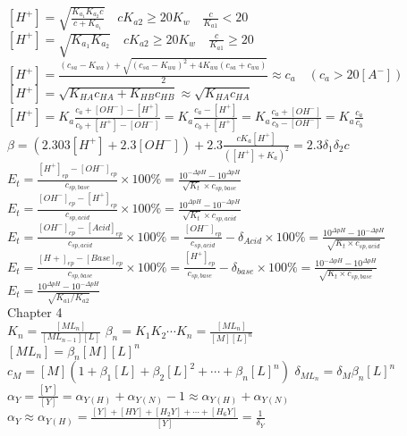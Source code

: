 \documentclass[10pt,twocolumn]{article}
\begin{document}
    \([H^+] =\sqrt{\frac{K_{a_1}K_{a_2}c}{c+K_{a_1}}} \quad cK_{a2} \geq 20K_w \quad \frac{c}{K_{a1}} < 20\) \\
    \([H^+] = \sqrt{K_{a_1}K_{a_2}} \quad cK_{a2} \geq 20K_w \quad \frac{c}{K_{a1}}\geq 20\) \\
    \([H^+]=\frac{(c_{sa}-K_{wa})+\sqrt{(c_{sa}-K_{wa})^2+4K_{wa}(c_{sa}+c_{wa})}}{2} \approx c_a \quad (c_a > 20[A^-])\)
    \\ \([H^+]=\sqrt{K_{HA}c_{HA}+K_{HB}c_{HB}} \approx \sqrt{K_{HA}c_{HA}}\)
    \\ \([H^+]=K_a\frac{c_a+[{OH}^-]-[H^+]}{c_b+[H^+]-[{OH}^-]}=K_a\frac{c_a-[H^+]}{c_b+[H^+]}=K_a\frac{c_a+[{OH}^-]}{c_b-[{OH}^-]}=K_a\frac{c_a}{c_b}\)
    \\ \(\beta = (2.303[H^+]+2.3[{OH}^-])+2.3\frac{cK_a[H^+]}{([H^+]+K_a)^2} = 2.3 \delta_1 \delta_2 c\) \\
    \(E_t=\frac{[H^+]_{ep}-[OH^-]_{ep}}{c_{sp,base}}\times 100\% = \frac{10^{-\Delta pH}-10^{\Delta pH}}{\sqrt{K_t}\times c_{sp,base}}\) \\
    \(E_t=\frac{[OH^-]_{ep}-[H^+]_{ep}}{c_{sp,acid}}\times 100\%= \frac{10^{\Delta pH}-10^{-\Delta pH}}{\sqrt{K_t}\times c_{sp,acid}}\) \\
    \(E_t=\frac{[OH^-]_{ep}-[Acid]_{ep}}{c_{sp,acid}}\times 100\% = \frac{[OH^-]_{ep}}{c_{sp,acid}} - \delta _{Acid}\times 100\% = \frac{10^{\Delta pH}-10^{-\Delta pH}}{\sqrt{K_t\times c_{sp,acid}}}\) \\
    \(E_t=\frac{[H+]_{ep}-[Base]_{ep}}{c_{sp,base}}\times 100\% = \frac{[H^+]_{ep}}{c_{sp,base}} - \delta _{base}\times 100\% = \frac{10^{-\Delta pH}-10^{\Delta pH}}{\sqrt{K_t\times c_{sp,base}}}\) \\
    \(E_t=\frac{10^{\Delta pH}-10^{-\Delta pH}}{\sqrt{K_{a1}/K_{a2}}}\) \\
    Chapter 4 \\
    \(K_n=\frac{[ML_n]}{[ML_{n-1}][L]}\) \quad
    \(\beta_n = K_1K_2\cdots K_n = \frac{[ML_n]}{[M][L]^n}\) \\
    \([ML_n]=\beta_n[M][L]^n\) \\
    \(c_M=[M](1+\beta_1[L]+\beta_2[L]^2+\cdots+\beta_n[L]^n)\) \quad
    \(\delta_{ML_n}=\delta_{M}\beta_{n}[L]^n\) \\
    \(\alpha_Y = \frac{[Y']}{[Y]} = \alpha_{Y(H)} + \alpha_{Y(N)} - 1 \approx \alpha_{Y(H)} + \alpha_{Y(N)}\)\\
    \(\alpha_Y \approx \alpha_{Y(H)}=\frac{[Y]+[HY]+[H_2Y]+\cdots+[H_6Y]}{[Y]}=\frac{1}{\delta_{Y}}\) \\
\end{document}
